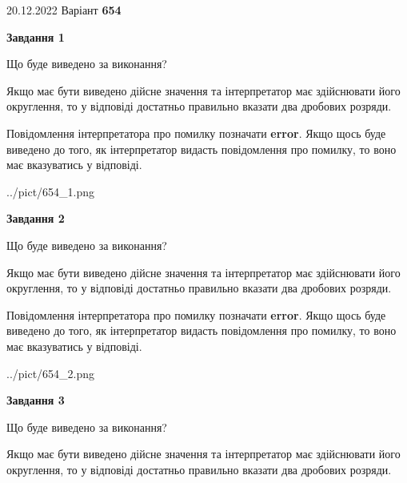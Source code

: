 \documentclass[12pt, ukrainian]{article}
\begin{document}
{20.12.2022 Варіант \No \textbf { 654 }\par}
{
\begin {Large}

{\begin {center}\textbf{Завдання 1}\end {center}}\par
Що буде виведено за виконання? \par

Якщо має бути виведено дійсне значення та інтерпретатор має здійснювати його округлення, 
то у відповіді достатньо правильно вказати два дробових розряди.

Повідомлення інтерпретатора про помилку позначати \textbf{error}.
Якщо щось буде виведено до того, як інтерпретатор видасть повідомлення про помилку, 
то воно має вказуватись у відповіді. \par

\begin{center}
	{../pict/654_1.png}
\end{center}
\newpage

{\begin {center}\textbf{Завдання 2}\end {center}}\par
Що буде виведено за виконання? \par

Якщо має бути виведено дійсне значення та інтерпретатор має здійснювати його округлення, 
то у відповіді достатньо правильно вказати два дробових розряди.

Повідомлення інтерпретатора про помилку позначати \textbf{error}.
Якщо щось буде виведено до того, як інтерпретатор видасть повідомлення про помилку, 
то воно має вказуватись у відповіді. \par

\begin{center}
	{../pict/654_2.png}
\end{center}
\newpage

{\begin {center}\textbf{Завдання 3}\end {center}}\par
Що буде виведено за виконання? \par

Якщо має бути виведено дійсне значення та інтерпретатор має здійснювати його округлення, 
то у відповіді достатньо правильно вказати два дробових розряди.


\end{Large}}
\end{document}
